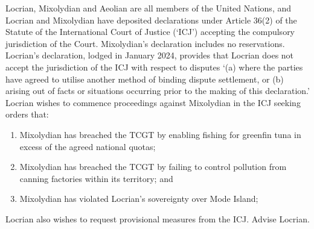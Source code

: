 \begin{tutorialquestion}
    Locrian, Mixolydian and Aeolian are all members of the United Nations, and Locrian and Mixolydian have deposited declarations under Article 36(2) of the Statute of the International Court of Justice (`ICJ') accepting the compulsory jurisdiction of the Court. Mixolydian's declaration includes no reservations. Locrian's declaration, lodged in January 2024, provides that Locrian does not accept the jurisdiction of the ICJ with respect to disputes `(a) where the parties have agreed to utilise another method of binding dispute settlement, or (b) arising out of facts or situations occurring prior to the making of this declaration.' Locrian wishes to commence proceedings against Mixolydian in the ICJ seeking orders that:

    \begin{enumerate}[label=(\alph*)]
        \item Mixolydian has breached the TCGT by enabling fishing for greenfin tuna in excess of the agreed national quotas;
        \item Mixolydian has breached the TCGT by failing to control pollution from canning factories within its territory; and
        \item Mixolydian has violated Locrian's sovereignty over Mode Island;
    \end{enumerate}

    Locrian also wishes to request provisional measures from the ICJ. Advise Locrian.
\end{tutorialquestion}

